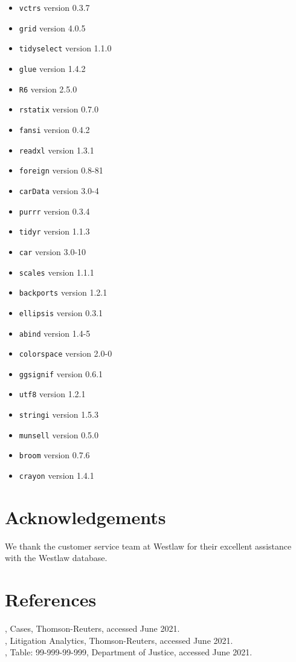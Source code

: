 \documentclass[11pt]{paper}
\begin{document}
\begin{itemize}
\item \texttt{vctrs} version 0.3.7       
\item \texttt{grid} version 4.0.5        
\item \texttt{tidyselect} version 1.1.0  
\item \texttt{glue} version 1.4.2       
\item \texttt{R6} version 2.5.0          
\item \texttt{rstatix} version 0.7.0     
\item \texttt{fansi} version 0.4.2       
\item \texttt{readxl} version 1.3.1      
\item \texttt{foreign} version 0.8-81    
\item \texttt{carData} version 3.0-4    
\item \texttt{purrr} version 0.3.4       
\item \texttt{tidyr} version 1.1.3       
\item \texttt{car} version 3.0-10        
\item \texttt{scales} version 1.1.1      
\item \texttt{backports} version 1.2.1  
\item \texttt{ellipsis} version 0.3.1    
\item \texttt{abind} version 1.4-5       
\item \texttt{colorspace} version 2.0-0  
\item \texttt{ggsignif} version 0.6.1    
\item \texttt{utf8} version 1.2.1        
\item \texttt{stringi} version 1.5.3    
\item \texttt{munsell} version 0.5.0     
\item \texttt{broom} version 0.7.6       
\item \texttt{crayon} version 1.4.1

\end{itemize}


\section*{Acknowledgements}


We thank the customer service team at Westlaw 
for their excellent assistance with the Westlaw database.



\section*{References}

, Cases, 
  Thomson-Reuters, accessed June 2021. \\

, Litigation Analytics, 
  Thomson-Reuters, accessed June 2021. \\

, Table: 99-999-99-999, 
    Department of Justice, accessed June 2021. \\
\end{document}

